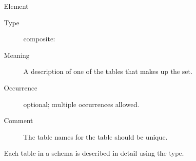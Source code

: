 \documentclass[11pt,a4paper]{ivoa}
\begin{document}
\begin{generated}
\begin{bigdescription}
\begin{description}
\end{description}
\item[Element \xmlel{table}]
\begin{description}
\item[Type] composite: 
\item[Meaning] 
               A description of one of the tables that makes up the set.
             
\item[Occurrence] optional; multiple occurrences allowed.
\item[Comment] 
               The table names for the table should be unique.
             

\end{description}


\end{bigdescription}\endgroup

\endgroup
\end{generated}



Each table in a schema is described in detail using the
 type.
\end{document}
